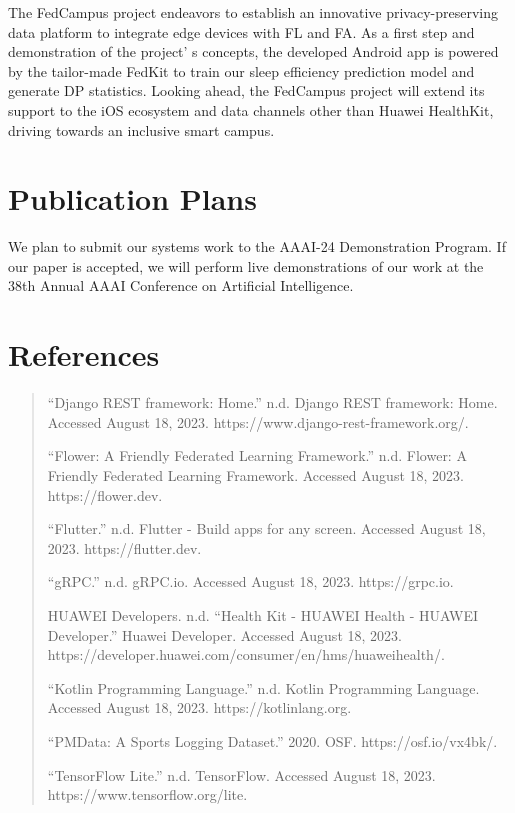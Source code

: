 \documentclass{article}
\begin{document}
\begin{multicols}{2}
The FedCampus project endeavors to establish an innovative
privacy-preserving data platform to integrate edge devices with FL and
FA. As a first step and demonstration of the project' s
concepts, the developed Android app is powered by the tailor-made FedKit
to train our sleep efficiency prediction model and generate DP
statistics. Looking ahead, the FedCampus project will extend its support
to the iOS ecosystem and data channels other than Huawei HealthKit,
driving towards an inclusive smart campus.

\section{Publication Plans}

We plan to submit our systems work to the AAAI-24 Demonstration Program.
If our paper is accepted, we will perform live demonstrations of our
work at the 38th Annual AAAI Conference on Artificial Intelligence.
\end{multicols}

\pagebreak
\section{References}
\begin{quote}

``Django REST framework: Home.'' n.d. Django REST framework: Home.
Accessed August 18, 2023. https://www.django-rest-framework.org/.

``Flower: A Friendly Federated Learning Framework.'' n.d. Flower: A
Friendly Federated Learning Framework. Accessed August 18, 2023.
https://flower.dev.

``Flutter.'' n.d. Flutter - Build apps for any screen. Accessed August
18, 2023. https://flutter.dev.

``gRPC.'' n.d. gRPC.io. Accessed August 18, 2023. https://grpc.io.

HUAWEI Developers. n.d. ``Health Kit - HUAWEI Health - HUAWEI
Developer.'' Huawei Developer. Accessed August 18, 2023.
https://developer.huawei.com/consumer/en/hms/huaweihealth/.

``Kotlin Programming Language.'' n.d. Kotlin Programming Language.
Accessed August 18, 2023. https://kotlinlang.org.

``PMData: A Sports Logging Dataset.'' 2020. OSF. https://osf.io/vx4bk/.

``TensorFlow Lite.'' n.d. TensorFlow. Accessed August 18, 2023.
https://www.tensorflow.org/lite.
\end{quote}
\end{document}
